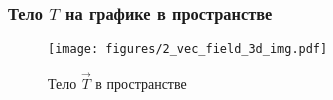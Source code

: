 \begin{frame}\frametitle{Тело \(T\) на графике в пространстве }

	\begin{figure}
		\centering
		\texttt{[image: figures/2\_vec\_field\_3d\_img.pdf]}
		\caption{Тело \(\vec T\) в пространстве}\label{fig:vec_field_graph}
	\end{figure}

\end{frame}
